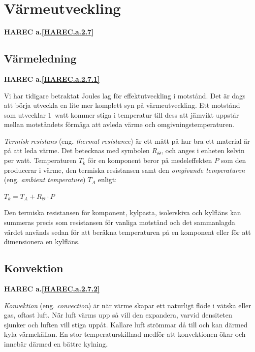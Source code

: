 \section{Värmeutveckling}

\textbf{
HAREC a.\ref{HAREC.a.2.7}\label{myHAREC.a.2.7}
}


\subsection{Värmeledning}

\textbf{
HAREC a.\ref{HAREC.a.2.7.1}\label{myHAREC.a.2.7.1}
}


Vi har tidigare betraktat Joules lag för effektutveckling i motstånd.
Det är dags att börja utveckla en lite mer komplett syn på värmeutveckling.
Ett motstånd som utvecklar 1~watt kommer stiga i temperatur till dess att
jämvikt uppstår mellan motståndets förmåga att avleda värme och
omgivningstemperaturen.

\emph{Termisk resistans} (eng. \emph{thermal resistance}) är ett mått på
hur bra ett material är på att leda värme. Det betecknas med symbolen \(R_\Theta\),
och anges i enheten kelvin per watt.
Temperaturen \(T_k\) för en komponent beror på medeleffekten \(P\) som den
producerar i värme, den termiska resistansen samt den \emph{omgivande temperaturen}
(eng. \emph{ambient temperature}) \(T_A\) enligt:

\(T_k = T_A + R_\Theta \cdot P\)

Den termiska resistansen för komponent, kylpasta, isolerskiva och kylfläns
kan summeras precis som resistansen för vanliga motstånd och det
sammanlagda värdet används sedan för att beräkna temperaturen på en
komponent eller för att dimensionera en kylfläns.

\subsection{Konvektion}
\textbf{
HAREC a.\ref{HAREC.a.2.7.2}\label{myHAREC.a.2.7.2}
}

\emph{Konvektion} (eng. \emph{convection}) är när värme skapar ett
naturligt flöde i vätska eller gas, oftast luft. När luft värms upp så
vill den expandera, varvid densiteten sjunker och luften vill stiga uppåt.
Kallare luft strömmar då till och kan därmed kyla värmekällan. En stor
temperaturskillnad medför att konvektionen ökar och innebär därmed en bättre
kylning.

